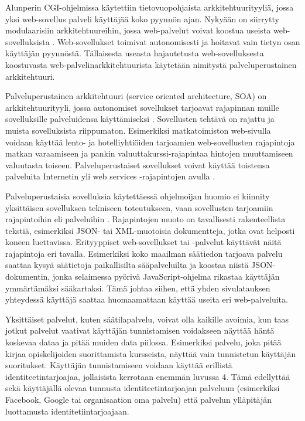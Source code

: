 Alunperin CGI-ohjelmissa käytettiin tietovuopohjaista arkkitehtuurityyliä, jossa yksi web-sovellus palveli käyttäjää koko pyynnön ajan. Nykyään on siirrytty modulaarisiin arkkitehtuureihin, jossa web-palvelut voivat koostua useista web-sovelluksista \cite{soa}. Web-sovellukset toimivat autonomisesti ja hoitavat vain tietyn osan käyttäjän pyynnöstä. Tällaisesta useasta hajautetusta web-sovelluksesta koostuvasta web-palvelinarkkitehtuurista käytetään nimitystä palveluperustainen arkkitehtuuri.

Palveluperustainen arkkitehtuuri (service oriented architecture, SOA) on arkkitehtuurityyli, jossa autonomiset sovellukset tarjoavat rajapinnan muille sovelluksille palveluidensa käyttämiseksi \cite{soa}. Sovellusten tehtävä on rajattu ja muista sovelluksista riippumaton. Esimerkiksi matkatoimiston web-sivulla voidaan käyttää lento- ja hotelliyhtiöiden tarjoamien web-sovellusten rajapintoja matkan varaamiseen ja pankin valuuttakurssi-rajapintaa hintojen muuttamiseen valuutasta toiseen. Palveluperustaiset sovellukset voivat käyttää toistensa palveluita Internetin yli web services -rajapintojen avulla \cite{soa}.

Palveluperustaisia sovelluksia käytettäessä ohjelmoijan huomio ei kiinnity yksittäisen sovelluksen tekniseen toteutukseen, vaan sovellusten tarjoamiin rajapintoihin eli palveluihin \cite{soa}. Rajapintojen muoto on tavallisesti rakenteellista tekstiä, esimerkiksi JSON- tai XML-muotoisia dokumentteja, jotka ovat helposti koneen luettavissa. Erityyppiset web-sovellukset tai -palvelut käyttävät näitä rajapintoja eri tavalla. Esimerkiksi koko maailman säätiedon tarjoava palvelu saattaa kysyä säätietoja paikallisilta sääpalveluilta ja koostaa niistä JSON-dokumentin, jonka selaimessa pyörivä JavaScript-ohjelma rikastaa käyttäjän ymmärtämäksi sääkartaksi. Tämä johtaa siihen, että yhden sivulatauksen yhteydessä käyttäjä saattaa huomaamattaan käyttää useita eri web-palveluita.

Yksittäiset palvelut, kuten säätilapalvelu, voivat olla kaikille avoimia, kun taas jotkut palvelut vaativat käyttäjän tunnistamisen voidakseen näyttää häntä koskevaa dataa ja pitää muiden data piilossa. Esimerkiksi palvelu, joka pitää kirjaa opiskelijoiden suorittamista kursseista, näyttää vain tunnistetun käyttäjän suoritukset. Käyttäjän tunnistamiseen voidaan käyttää erillistä identiteetintarjoajaa, jollaisista kerrotaan enemmän luvussa 4. Tämä edellyttää sekä käyttäjällä olevaa tunnusta identiteetintarjoajan palveluun (esimerkiksi Facebook, Google tai organisaation oma palvelu) että palvelun ylläpitäjän luottamusta identitetiintarjoajaan.